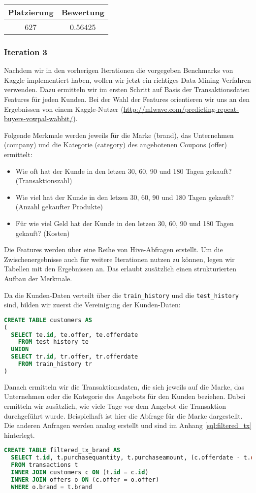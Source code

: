 \begin{tabular}{|c|c|}
	\hline \textbf{Platzierung} & \textbf{Bewertung} \\ 
	\hline 627 & 0.56425  \\ 
	\hline 
\end{tabular}

\subsubsection{Iteration 3}

Nachdem wir in den vorherigen Iterationen die vorgegeben Benchmarks von Kaggle implementiert haben,
wollen wir jetzt ein richtiges Data-Mining-Verfahren verwenden. Dazu ermitteln wir im ersten Schritt
auf Basis der Transaktionsdaten Features für jeden Kunden. Bei der Wahl der Features orientieren
wir uns an den Ergebnissen von einem Kaggle-Nutzer (\url{http://mlwave.com/predicting-repeat-buyers-vowpal-wabbit/}).

Folgende Merkmale werden jeweils für die Marke (brand), das Unternehmen (company) und die Kategorie (category)
des angebotenen Coupons (offer) ermittelt:
\begin{itemize}
	\item Wie oft hat der Kunde in den letzen 30, 60, 90 und 180 Tagen gekauft? (Transaktionszahl)
	\item Wie viel hat der Kunde in den letzen 30, 60, 90 und 180 Tagen gekauft? (Anzahl gekaufter Produkte)
	\item Für wie viel Geld hat der Kunde in den letzen 30, 60, 90 und 180 Tagen gekauft? (Kosten)
\end{itemize}

Die Features werden über eine Reihe von Hive-Abfragen erstellt. Um die Zwischenergebnisse auch für
weitere Iterationen nutzen zu können, legen wir Tabellen mit den Ergebnissen an. Das erlaubt zusätzlich
einen strukturierten Aufbau der Merkmale.

Da die Kunden-Daten verteilt über die \texttt{train\_history} und die \texttt{test\_history} sind, 
bilden wir zuerst die Vereinigung der Kunden-Daten:
\begin{lstlisting}[language=SQL]
CREATE TABLE customers AS 
(
  SELECT te.id, te.offer, te.offerdate
    FROM test_history te
  UNION
  SELECT tr.id, tr.offer, tr.offerdate
    FROM train_history tr 
)
\end{lstlisting}
Danach ermitteln wir die Transaktionsdaten, die sich jeweils auf die Marke, das Unternehmen oder 
die Kategorie des Angebots für den Kunden beziehen. Dabei ermitteln wir zusätzlich, wie viele
Tage vor dem Angebot die Transaktion durchgeführt wurde. Beispielhaft ist hier die Abfrage
für die Marke dargestellt. Die anderen Anfragen werden analog erstellt und sind im Anhang
\ref{sql:filtered_tx} hinterlegt.
\begin{lstlisting}[language=SQL]
CREATE TABLE filtered_tx_brand AS
  SELECT t.id, t.purchasequantity, t.purchaseamount, (c.offerdate - t.date) AS daysbefore 
  FROM transactions t 
  INNER JOIN customers c ON (t.id = c.id)
  INNER JOIN offers o ON (c.offer = o.offer)
  WHERE o.brand = t.brand
\end{lstlisting}


